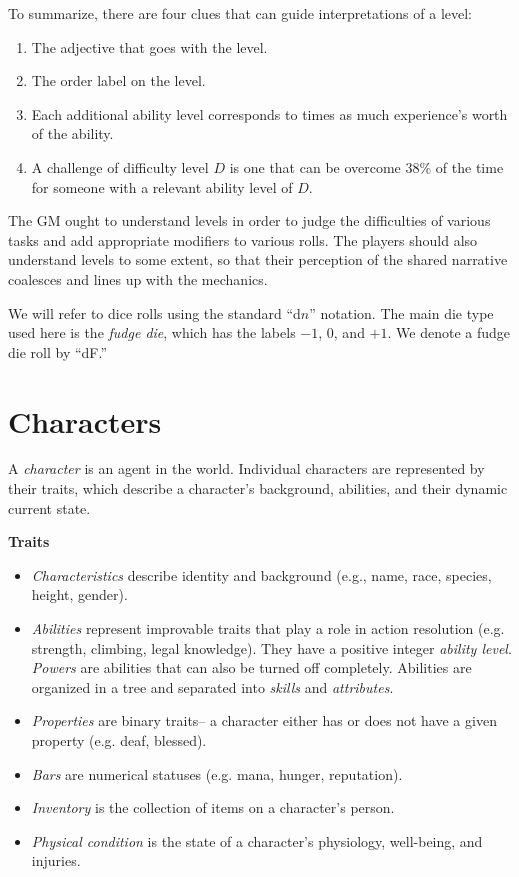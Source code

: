 \documentclass[12pt]{article}
\newcommand{\emdex}[1]{\emph{#1}\index{#1}}
\begin{document}
To summarize, there are four clues that can guide interpretations of a level:
\vspace{-1em}\begin{enumerate}
\item The adjective that goes with the level.
\item The order label on the level.
\item Each additional ability level corresponds to
 times as much experience's worth of the ability.
\item A challenge of difficulty level $D$ is one that can be overcome $38\%$ of the time for
someone with a relevant ability level of $D$.
\end{enumerate}
The GM ought to understand levels in order to judge the difficulties of various tasks
and add appropriate modifiers to various rolls.
The players should also understand levels to some extent,
so that their perception of the shared narrative coalesces and lines up with the mechanics.

We will refer to dice rolls using the standard ``d$n$'' notation.
The main die type used here is the \emdex{fudge die},
which has the labels $-1$, $0$, and $+1$.
We denote a fudge die roll by ``dF.''


\section{Characters}
A \emph{character}
 is an agent in the world.
Individual characters are represented by their traits,
which describe a character's background, abilities, and their dynamic current state.

\textbf{Traits}\vspace{-1em}
\begin{itemize}
\item \emph{Characteristics}
describe identity and background
(e.g., name, race, species, height, gender).
\item \emph{Abilities}
represent improvable traits that play a role in action resolution
(e.g. strength, climbing, legal knowledge).
They have a positive integer \emph{ability level}.
\emph{Powers} are abilities that can also be turned off completely.
Abilities are organized in a tree and separated into \emph{skills} and \emph{attributes}.
\item \emph{Properties} are binary traits-- a character either has or does not have a given property
(e.g. deaf, blessed).
\item \emph{Bars} are numerical statuses (e.g. mana, hunger, reputation).
\item \emph{Inventory} is the collection of items on a character's person.
\item \emph{Physical condition} is the state of a character's physiology, well-being, and injuries.
\end{itemize}
\end{document}
